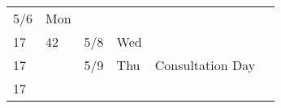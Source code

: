 \begin{longtable}[]{@{}llllll@{}}
\begin{minipage}[t]{0.06\columnwidth}
5/6\strut
\end{minipage} & \begin{minipage}[t]{0.04\columnwidth}\raggedright
Mon\strut
\end{minipage} & \begin{minipage}[t]{0.49\columnwidth}\raggedright
\strut
\end{minipage} & \begin{minipage}[t]{0.17\columnwidth}\raggedright
\strut
\end{minipage}\tabularnewline
\begin{minipage}[t]{0.03\columnwidth}\raggedright
17\strut
\end{minipage} & \begin{minipage}[t]{0.03\columnwidth}\raggedright
42\strut
\end{minipage} & \begin{minipage}[t]{0.06\columnwidth}\raggedright
5/8\strut
\end{minipage} & \begin{minipage}[t]{0.04\columnwidth}\raggedright
Wed\strut
\end{minipage} & \begin{minipage}[t]{0.49\columnwidth}\raggedright
\strut
\end{minipage} & \begin{minipage}[t]{0.17\columnwidth}\raggedright
\strut
\end{minipage}\tabularnewline
\begin{minipage}[t]{0.03\columnwidth}\raggedright
17\strut
\end{minipage} & \begin{minipage}[t]{0.03\columnwidth}\raggedright
\strut
\end{minipage} & \begin{minipage}[t]{0.06\columnwidth}\raggedright
5/9\strut
\end{minipage} & \begin{minipage}[t]{0.04\columnwidth}\raggedright
Thu\strut
\end{minipage} & \begin{minipage}[t]{0.49\columnwidth}\raggedright
Consultation Day\strut
\end{minipage} & \begin{minipage}[t]{0.17\columnwidth}\raggedright
\strut
\end{minipage}\tabularnewline
\begin{minipage}[t]{0.03\columnwidth}\raggedright
17\strut
\end{minipage} & \begin{minipage}[t]{0.03\columnwidth}\raggedright

\end{minipage}
\end{longtable}
